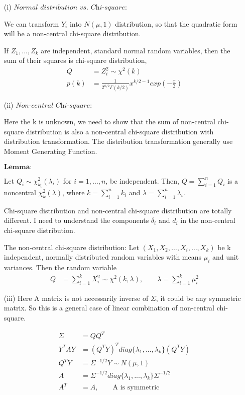 \documentclass[11pt]{article} %
\begin{document}
	\begin{itemize}
		\item [(i)] $\textit{Normal distribution vs. Chi-square:}$ 
		
			We can transform $Y_i$ into $N(\mu, 1)$ distribution, so that the quadratic form will be a non-central chi-square distribution. 
		
		If $Z_1, ..., Z_k$ are independent, standard normal random variables, then the sum of their squares is chi-square distribution,
		\begin{align*}
			Q &= Z_i^2 \sim \chi^2(k)\\
			p(k) &= \frac{1}{2^{k/2} \Gamma(k/2)} x^{k/2-1} exp(-\frac{x}{2})
		\end{align*}
	
		\item [(ii)] $\textit{Non-central Chi-square:}$ 
		
	Here the k is unknown, we need to show that the sum of non-central chi-square distribution is also a non-central chi-square distribution with distribution transformation. The distribution transformation generally use Moment Generating Function.		
		
		$\textbf{Lemma:}$	
		
		Let $Q_i \sim \chi^2 _{k_i}(\lambda_i)$ for $i=1,…,n$, be independent. Then, $Q = \sum_{i=1}^n Q_i$ is a noncentral $\chi^2_k(\lambda)$, where $k = \sum_{i=1}^n k_i$ and $\lambda =\sum_{i=1}^n \lambda_i$.
		
		Chi-square distribution and non-central chi-square distribution are totally different. I need to understand the components $\delta_i$ and $d_i$ in the non-central chi-square distribution.
		
		
		The non-central chi-square distribution: Let $(X_{1},X_{2},\ldots ,X_{i},\ldots ,X_{k})$ be k independent, normally distributed random variables with means $\mu _{i}$ and unit variances. Then the random variable
		\begin{align*}
			Q &= \sum_{i=1}^k X_i^2 \sim \chi^2(k, \lambda), \qquad \lambda = \sum_{i=1}^k \mu_i^2
		\end{align*}
	
	\item [(iii)] Here A matrix is not necessarily inverse of $\Sigma$, it could be any symmetric matrix. So this is a general case of linear combination of non-central chi-square.
	
\begin{align*}
	\Sigma &= Q Q^T \\
	Y^T A Y &= (Q^T Y)^T diag\{ \lambda_1, ... , \lambda_k\} (Q^T Y)\\
	Q^T Y	&= \Sigma^{-1/2} Y \sim N(\mu, 1)\\
	 A &= \Sigma^{-1/2} diag\{ \lambda_1, ... , \lambda_k\} \Sigma^{-1/2}\\
	A^T &= A, \qquad \text{A is symmetric}
\end{align*}	
		
	\end{itemize}
\end{document}
